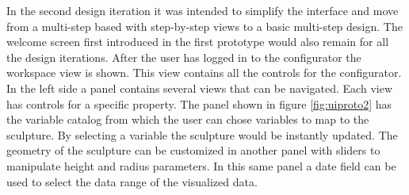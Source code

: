 \documentclass[../medieninformatik-arbeit.tex]{subfiles}
\begin{document}
In the second design iteration it was intended to simplify the interface and move from a multi-step based with step-by-step views to a basic multi-step design. The welcome screen first introduced in the first prototype would also remain for all the design iterations. After the user has logged in to the configurator the workspace view is shown. This view contains all the controls for the configurator. In the left side a panel contains several views that can be navigated. Each view has controls for a specific property. The panel shown in figure \ref{fig:uiproto2} has the variable catalog from which the user can chose variables to map to the sculpture. By selecting a variable the sculpture would be instantly updated. The geometry of the sculpture can be customized in another panel with sliders to manipulate height and radius parameters. In this same panel a date field can be used to select the data range of the visualized data.
\end{document}
